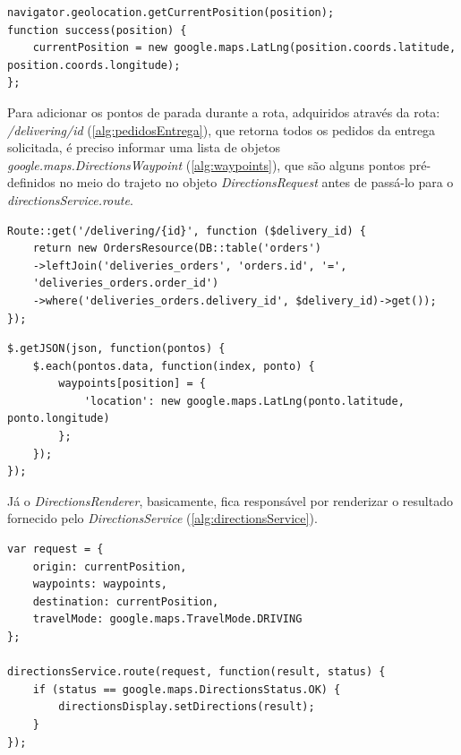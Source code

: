 \begin{lstlisting}[caption={Delivery Routes - Função de localização do usuário}, style=htmlcssjs, label=alg:currentPosition]
navigator.geolocation.getCurrentPosition(position);
function success(position) {
    currentPosition = new google.maps.LatLng(position.coords.latitude, position.coords.longitude);
};
\end{lstlisting}

Para adicionar os pontos de parada durante a rota, adquiridos através da rota: \textit{/delivering/{id}} (\autoref{alg:pedidosEntrega}), que retorna todos os pedidos da entrega solicitada, é preciso informar uma lista de objetos \textit{google.maps.DirectionsWaypoint} (\autoref{alg:waypoints}), que são alguns pontos pré-definidos no meio do trajeto no objeto \textit{DirectionsRequest} antes de passá-lo para o \textit{directionsService.route}.

\begin{lstlisting}[caption={Delivery Routes - Route pedidos da entrega}, style=htmlcssjs, label=alg:pedidosEntrega]
Route::get('/delivering/{id}', function ($delivery_id) {
    return new OrdersResource(DB::table('orders')
    ->leftJoin('deliveries_orders', 'orders.id', '=', 
    'deliveries_orders.order_id')
    ->where('deliveries_orders.delivery_id', $delivery_id)->get());
});
\end{lstlisting}

\begin{lstlisting}[caption={Delivery Routes - Preenchimento dos pontos de parada}, style=htmlcssjs, label=alg:waypoints]
$.getJSON(json, function(pontos) {
    $.each(pontos.data, function(index, ponto) {
        waypoints[position] = {
            'location': new google.maps.LatLng(ponto.latitude, ponto.longitude)
        };
    });
});
\end{lstlisting}

\newpage
Já o \textit{DirectionsRenderer}, basicamente, fica responsável por renderizar o resultado fornecido pelo \textit{DirectionsService} (\autoref{alg:directionsService}).

\begin{lstlisting}[caption={Delivery Routes - Requisição de renderização do mapa}, style=htmlcssjs, label=alg:directionsService]
var request = {
    origin: currentPosition,
    waypoints: waypoints,
    destination: currentPosition,
    travelMode: google.maps.TravelMode.DRIVING
};

directionsService.route(request, function(result, status) {
    if (status == google.maps.DirectionsStatus.OK) {
        directionsDisplay.setDirections(result);
    }
});
\end{lstlisting}

